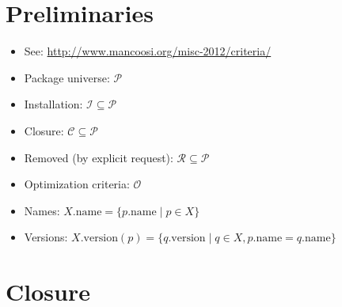 \documentclass[a4paper,english]{article}
\newcommand{\universe}{\mathcal{P}}
\newcommand{\closure}{\mathcal{C}}
\newcommand{\installation}{\mathcal{I}}
\newcommand{\removed}{\mathcal{R}}
\newcommand{\optimization}{\mathcal{O}}
\newcommand{\name}{\mathrm{name}}
\newcommand{\version}{\mathrm{version}}
\begin{document}
\section{Preliminaries}

\begin{itemize}
  \item See: \url{http://www.mancoosi.org/misc-2012/criteria/}
  \item Package universe: $\universe$ 
  \item Installation: $\installation\subseteq\universe$
  \item Closure: $\closure\subseteq\universe$
  \item Removed (by explicit request): $\removed\subseteq\universe$
  \item Optimization criteria: $\optimization$
  \item Names: $X.\name=\{p.\name\mid p\in X\}$
  \item Versions: $X.\version(p)=\{q.\version\mid q\in X,p.\name=q.\name\}$
\end{itemize}

\section{Closure}
\end{document}
